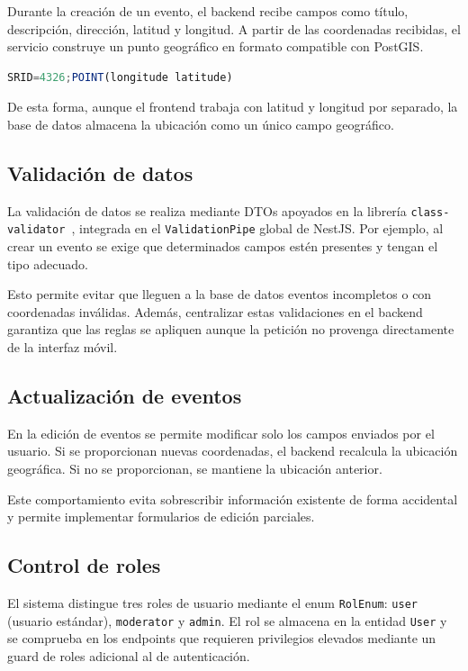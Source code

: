 Durante la creación de un evento, el backend recibe campos como título, descripción, dirección, latitud y longitud. A partir de las coordenadas recibidas, el servicio construye un punto geográfico en formato compatible con PostGIS.

\begin{lstlisting}[language=JavaScript, caption={Construcción conceptual de la ubicación geográfica de un evento}]
SRID=4326;POINT(longitude latitude)
\end{lstlisting}

De esta forma, aunque el frontend trabaja con latitud y longitud por separado, la base de datos almacena la ubicación como un único campo geográfico.

\subsection{Validación de datos}

La validación de datos se realiza mediante DTOs apoyados en la librería \texttt{class-validator}~\cite{classvalidator}, integrada en el \texttt{ValidationPipe} global de NestJS. Por ejemplo, al crear un evento se exige que determinados campos estén presentes y tengan el tipo adecuado.

Esto permite evitar que lleguen a la base de datos eventos incompletos o con coordenadas inválidas. Además, centralizar estas validaciones en el backend garantiza que las reglas se apliquen aunque la petición no provenga directamente de la interfaz móvil.

\subsection{Actualización de eventos}

En la edición de eventos se permite modificar solo los campos enviados por el usuario. Si se proporcionan nuevas coordenadas, el backend recalcula la ubicación geográfica. Si no se proporcionan, se mantiene la ubicación anterior.

Este comportamiento evita sobrescribir información existente de forma accidental y permite implementar formularios de edición parciales.

\subsection{Control de roles}

El sistema distingue tres roles de usuario mediante el enum \texttt{RolEnum}: \texttt{user} (usuario estándar), \texttt{moderator} y \texttt{admin}. El rol se almacena en la entidad \texttt{User} y se comprueba en los endpoints que requieren privilegios elevados mediante un guard de roles adicional al de autenticación.

